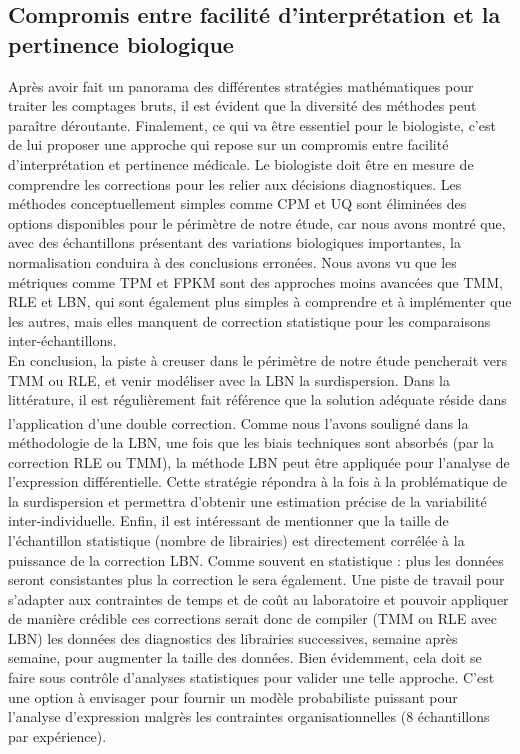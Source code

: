 \subsection{Compromis entre facilité d'interprétation et la pertinence biologique}

Après avoir fait un panorama des différentes stratégies mathématiques pour traiter les comptages bruts, il est évident que la diversité des méthodes peut paraître déroutante. Finalement, ce qui va être essentiel pour le biologiste, c'est de lui proposer une approche qui repose sur un compromis entre facilité d'interprétation et pertinence médicale. Le biologiste doit être en mesure de comprendre les corrections pour les relier aux décisions diagnostiques. Les méthodes conceptuellement simples comme CPM et UQ sont éliminées des options disponibles pour le périmètre de notre étude, car nous avons montré que, avec des échantillons présentant des variations biologiques importantes, la normalisation conduira à des conclusions erronées. Nous avons vu que les métriques comme TPM et FPKM sont des approches moins avancées que TMM, RLE et LBN, qui sont également plus simples à comprendre et à implémenter que les autres, mais elles manquent de correction statistique pour les comparaisons inter-échantillons.\\

En conclusion, la piste à creuser dans le périmètre de notre étude pencherait vers TMM ou RLE, et venir modéliser avec la LBN la surdispersion. Dans la littérature, il est régulièrement fait référence que la solution adéquate réside dans l'application d'une double correction\textsuperscript{\cite{robinson_scaling_2010}}. Comme nous l'avons souligné dans la méthodologie de la LBN, une fois que les biais techniques sont absorbés (par la correction RLE ou TMM), la méthode LBN peut être appliquée pour l'analyse de l'expression différentielle. Cette stratégie répondra à la fois à la problématique de la surdispersion et permettra d'obtenir une estimation précise de la variabilité inter-individuelle. Enfin, il est intéressant de mentionner que la taille de l'échantillon statistique (nombre de librairies) est directement corrélée à la puissance de la correction LBN. Comme souvent en statistique : plus les données seront consistantes plus la correction le sera également. Une piste de travail pour s'adapter aux contraintes de temps et de coût au laboratoire et pouvoir appliquer de manière crédible ces corrections serait donc de compiler (TMM ou RLE avec LBN) les données des diagnostics des librairies successives, semaine après semaine, pour augmenter la taille des données.
 Bien évidemment, cela doit se faire sous contrôle d'analyses statistiques pour valider une telle approche. 
C'est une option à envisager pour fournir un modèle probabiliste puissant pour l'analyse d'expression malgrès les contraintes organisationnelles (8 échantillons par expérience).


